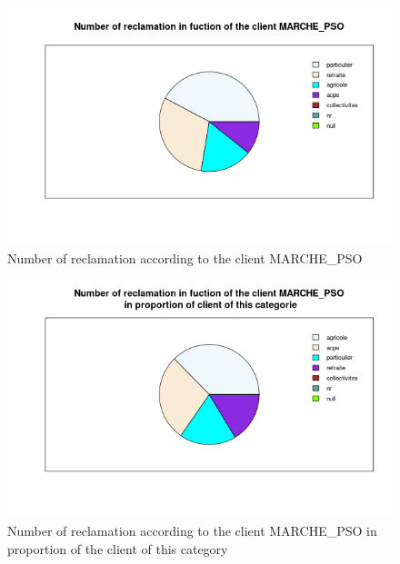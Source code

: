 \documentclass[a4paper, 11pt]{article}
\begin{document}
    \begin{figure}[!ht]
    	\centering
            \includegraphics[height = 10 cm]{Valentin/Number_of_reclamation_in_fuction_of_the_client_MARCHE_PSO.png}
            \caption{Number of reclamation according to the client MARCHE\_PSO}
            \label{fig:reclamtion_pso1}
    \end{figure}
    
    \begin{figure}[!ht]
    	\centering
            \includegraphics[height = 10 cm]{Valentin/Number_of_reclamation_in_fuction_of_the_client_MARCHE_PSO_proportion.png}
            \caption{Number of reclamation according to the client MARCHE\_PSO in proportion of the client of this category}
            \label{fig:reclamtion_pso2}
    \end{figure}
    
\end{document}
